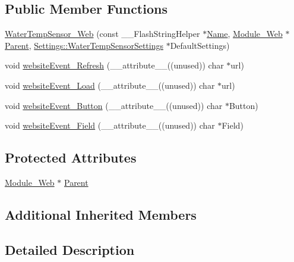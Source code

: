 \subsection*{Public Member Functions}
\begin{DoxyCompactItemize}
\item 
\hyperlink{class_water_temp_sensor___web_ae52b9b96ac5a1c38b4392df32fe4f2c8}{Water\+Temp\+Sensor\+\_\+\+Web} (const \+\_\+\+\_\+\+Flash\+String\+Helper $\ast$\hyperlink{class_common_aeea91a726dbe988e515057b32ba0726f}{Name}, \hyperlink{class_module___web}{Module\+\_\+\+Web} $\ast$\hyperlink{class_water_temp_sensor___web_a280430f35417e6e84ca307734f9e18b3}{Parent}, \hyperlink{struct_settings_1_1_water_temp_sensor_settings}{Settings\+::\+Water\+Temp\+Sensor\+Settings} $\ast$Default\+Settings)
\item 
void \hyperlink{class_water_temp_sensor___web_a930d46ab1e337e085a06058d8c07f76b}{website\+Event\+\_\+\+Refresh} (\+\_\+\+\_\+attribute\+\_\+\+\_\+((unused)) char $\ast$url)
\item 
void \hyperlink{class_water_temp_sensor___web_a89df0a40b5304ee5dc164bf89a6198e9}{website\+Event\+\_\+\+Load} (\+\_\+\+\_\+attribute\+\_\+\+\_\+((unused)) char $\ast$url)
\item 
void \hyperlink{class_water_temp_sensor___web_a74a2ece81622e14523727c69a093477b}{website\+Event\+\_\+\+Button} (\+\_\+\+\_\+attribute\+\_\+\+\_\+((unused)) char $\ast$Button)
\item 
void \hyperlink{class_water_temp_sensor___web_a893dd03626c604d634816d0feca46706}{website\+Event\+\_\+\+Field} (\+\_\+\+\_\+attribute\+\_\+\+\_\+((unused)) char $\ast$Field)
\end{DoxyCompactItemize}
\subsection*{Protected Attributes}
\begin{DoxyCompactItemize}
\item 
\hyperlink{class_module___web}{Module\+\_\+\+Web} $\ast$ \hyperlink{class_water_temp_sensor___web_a280430f35417e6e84ca307734f9e18b3}{Parent}
\end{DoxyCompactItemize}
\subsection*{Additional Inherited Members}


\subsection{Detailed Description}


